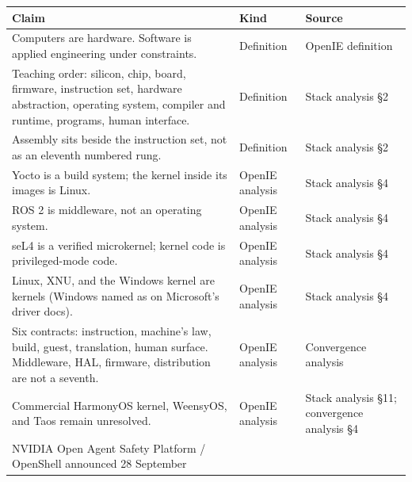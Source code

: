\documentclass[10pt,letterpaper]{article}
\newcounter{none}
\begin{document}
{\def\LTcaptype{none} %
{\footnotesize\setlength{\tabcolsep}{3.8pt}\renewcommand{\arraystretch}{1.15}
\begin{longtable}[]{@{}
  >{\raggedright\arraybackslash}p{}
  >{\raggedright\arraybackslash}p{}
  >{\raggedright\arraybackslash}p{}@{}}
\toprule\noalign{}
\begin{minipage}[b]{\linewidth}\raggedright
\textbf{Claim}
\end{minipage} & \begin{minipage}[b]{\linewidth}\raggedright
\textbf{Kind}
\end{minipage} & \begin{minipage}[b]{\linewidth}\raggedright
\textbf{Source}
\end{minipage} \\
\midrule\noalign{}
\endhead
\bottomrule\noalign{}
\endlastfoot
Computers are hardware. Software is applied engineering under
constraints. & Definition & OpenIE definition \\
Teaching order: silicon, chip, board, firmware, instruction set,
hardware abstraction, operating system, compiler and runtime, programs,
human interface. & Definition & Stack analysis §2 \\
Assembly sits beside the instruction set, not as an eleventh numbered
rung. & Definition & Stack analysis §2 \\
Yocto is a build system; the kernel inside its images is Linux. & OpenIE
analysis & Stack analysis §4 \\
ROS 2 is middleware, not an operating system. & OpenIE analysis & Stack
analysis §4 \\
seL4 is a verified microkernel; kernel code is privileged-mode code. &
OpenIE analysis & Stack analysis §4 \\
Linux, XNU, and the Windows kernel are kernels (Windows named as on
Microsoft's driver docs). & OpenIE analysis & Stack analysis §4 \\
Six contracts: instruction, machine's law, build, guest, translation,
human surface. Middleware, HAL, firmware, distribution are not a
seventh. & OpenIE analysis & Convergence analysis \\
Commercial HarmonyOS kernel, WeensyOS, and Taos remain unresolved. &
OpenIE analysis & Stack analysis §11; convergence analysis §4 \\
NVIDIA Open Agent Safety Platform / OpenShell announced 28 September

\end{longtable}}}
\end{document}
